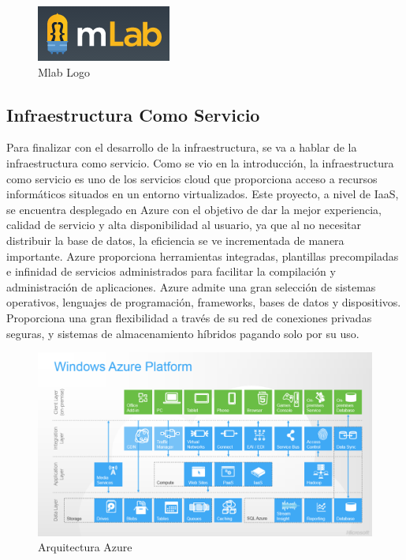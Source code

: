 \documentclass[a4paper,11pt]{book}
\begin{document}
\begin{figure}[H] 
\centering 
\includegraphics[scale=0.50]{imagenes/desarrollo_herramienta/mlab.png}
\caption{ Mlab Logo\cite{mlabL}  }  
\end{figure} 
  

\subsection{Infraestructura Como Servicio}
Para finalizar con el desarrollo de la infraestructura, se va a hablar de la infraestructura como servicio. Como se vio en la introducción, la infraestructura como servicio es uno de los servicios cloud que proporciona acceso a recursos informáticos situados en un entorno virtualizados. Este proyecto, a nivel de IaaS, se encuentra desplegado en Azure\cite{azure} con el objetivo de  dar la mejor experiencia, calidad de servicio y alta disponibilidad al usuario, ya que al no necesitar distribuir la base de datos, la eficiencia se ve incrementada de manera importante.
Azure proporciona herramientas integradas, plantillas precompiladas e infinidad de servicios administrados para facilitar la compilación y administración de aplicaciones. Azure admite una gran selección de sistemas operativos, lenguajes de programación, frameworks, bases de datos y dispositivos. Proporciona una gran flexibilidad a través de su red de conexiones privadas seguras, y sistemas de almacenamiento híbridos pagando solo por su uso. 

\begin{figure}[H] 
\centering 
\includegraphics[scale=0.50]{imagenes/desarrollo_herramienta/azure.png}
\caption{ Arquitectura Azure\cite{azureA}  }  
\end{figure}
\end{document}

